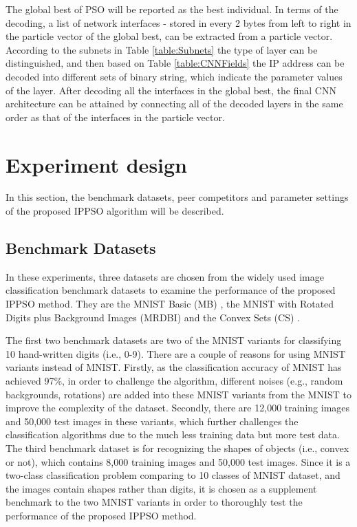 \documentclass[conference]{IEEEtran}
\begin{document}
The global best of PSO will be reported as the best individual. In terms of the decoding, a list of network interfaces - stored in every 2 bytes from left to right in the particle vector of the global best, can be extracted from a particle vector. According to the subnets in Table \ref{table:Subnets} the type of layer can be distinguished, and then based on Table \ref{table:CNNFields} the IP address can be decoded into different sets of binary string, which indicate the parameter values of the layer. After decoding all the interfaces in the global best, the final CNN architecture can be attained by connecting all of the decoded layers in the same order as that of the interfaces in the particle vector.

\section{Experiment design}\label{sec:EPDesign}


In this section, the benchmark datasets, peer competitors and parameter settings of the proposed IPPSO algorithm will be described.


\subsection{Benchmark Datasets}\label{sec:EPDatasets}

In these experiments, three datasets are chosen from the widely used image classification benchmark datasets to examine the performance of the proposed IPPSO method. They are the MNIST Basic (MB) \cite{DeepArchitectureEval:Larochelle}, the MNIST with Rotated Digits plus Background Images (MRDBI) \cite{DeepArchitectureEval:Larochelle} and the Convex Sets (CS) \cite{DeepArchitectureEval:Larochelle}.

The first two benchmark datasets are two of the MNIST \cite{DocumentRecognition:LeCun} variants for classifying 10 hand-written digits (i.e., 0-9). There are a couple of reasons for using MNIST variants instead of MNIST. Firstly, as the classification accuracy of MNIST has achieved 97\%, in order to challenge the algorithm, different noises (e.g., random backgrounds, rotations) are added into these MNIST variants from the MNIST to improve the complexity of the dataset. Secondly, there are 12,000 training images and 50,000 test images in these variants, which further challenges the classification algorithms due to the much less training data but more test data. The third benchmark dataset is for recognizing the shapes of objects (i.e., convex or not), which contains 8,000 training images and 50,000 test images. Since it is a two-class classification problem comparing to 10 classes of MNIST dataset, and the images contain shapes rather than digits, it is chosen as a supplement benchmark to the two MNIST variants in order to thoroughly test the performance of the proposed IPPSO method.
\end{document}
